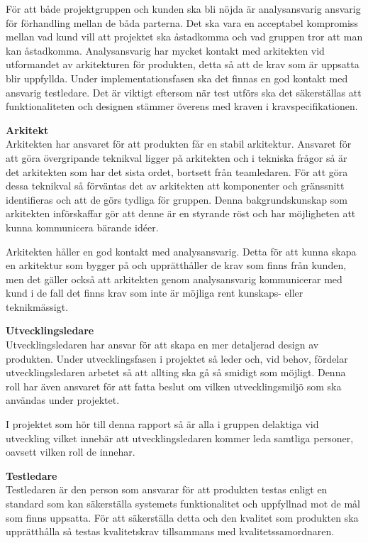 För att både projektgruppen och kunden ska bli nöjda är analysansvarig ansvarig för förhandling mellan de båda parterna. Det ska vara en acceptabel kompromiss mellan vad kund vill att projektet ska åstadkomma och vad gruppen tror att man kan åstadkomma. Analysansvarig har mycket kontakt med arkitekten vid utformandet av arkitekturen för produkten, detta så att de krav som är uppsatta blir uppfyllda. Under implementationsfasen ska det finnas en god kontakt med ansvarig testledare. Det är viktigt eftersom när test utförs ska det säkerställas att funktionaliteten och designen stämmer överens med kraven i kravspecifikationen.

\textbf{Arkitekt}\\
Arkitekten har ansvaret för att produkten får en stabil arkitektur. Ansvaret för att göra övergripande teknikval ligger på arkitekten och i tekniska frågor så är det arkitekten som har det sista ordet, bortsett från teamledaren. För att göra dessa teknikval så förväntas det av arkitekten att komponenter och gränssnitt identifieras och att de görs tydliga för gruppen. Denna bakgrundskunskap som arkitekten införskaffar gör att denne är en styrande röst och har möjligheten att kunna kommunicera bärande idéer.

Arkitekten håller en god kontakt med analysansvarig. Detta för att kunna skapa en arkitektur som bygger på och upprätthåller de krav som finns från kunden, men det gäller också att arkitekten genom analysansvarig kommunicerar med kund i de fall det finns krav som inte är möjliga rent kunskaps- eller teknikmässigt.

\textbf{Utvecklingsledare}\\
Utvecklingsledaren har ansvar för att skapa en mer detaljerad design av produkten. Under utvecklingsfasen i projektet så leder och, vid behov, fördelar utvecklingsledaren arbetet så att allting ska gå så smidigt som möjligt. Denna roll har även ansvaret för att fatta beslut om vilken utvecklingsmiljö som ska användas under projektet.

I projektet som hör till denna rapport så är alla i gruppen delaktiga vid utveckling vilket innebär att utvecklingsledaren kommer leda samtliga personer, oavsett vilken roll de innehar.

\textbf{Testledare}\\
Testledaren är den person som ansvarar för att produkten testas enligt en standard som kan säkerställa systemets funktionalitet och uppfyllnad mot de mål som finns uppsatta. För att säkerställa detta och den kvalitet som produkten ska upprätthålla så testas kvalitetskrav tillsammans med kvalitetssamordnaren.

